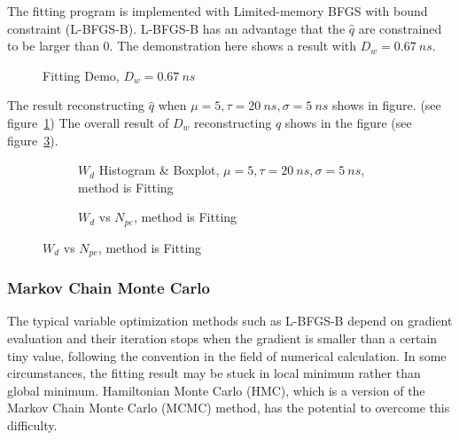 The fitting program is implemented with Limited-memory BFGS with bound constraint \cite{byrd_limited_1995} (L-BFGS-B). L-BFGS-B has an advantage that the $\hat{q}$ are constrained to be larger than 0. The demonstration here shows a result with $D_w = \SI{0.67}{ns}$.

\begin{figure}[H]
    \centering
    \scalebox{0.4}{}
    \caption{Fitting Demo, $D_w = \SI{0.67}{ns}$}
\end{figure}

The result reconstructing $\hat{q}$ when $\mu=5, \tau=\SI{20}{ns}, \sigma=\SI{5}{ns}$ shows in figure. (see figure~\ref{fig:fitting-hist}) The overall result of $D_w$ reconstructing $\hat{q}$ shows in the figure (see figure~\ref{fig:fitting-npe}). 

\begin{figure}[H]
\begin{minipage}[t]{.5\textwidth}
\begin{figure}[H]
    \centering
    \resizebox{\textwidth}{!}{}
    \caption{\label{fig:fitting-hist} $W_{d}$ Histogram \& Boxplot, $\mu=5, \tau=\SI{20}{ns}, \sigma=\SI{5}{ns}$, method is Fitting}
\end{figure}
\end{minipage}
\begin{minipage}[t]{.5\textwidth}
\begin{figure}[H]
    \centering
    \resizebox{\textwidth}{!}{}
    \caption{\label{fig:fitting-npe} $W_{d}$ vs $N_{pe}$, method is Fitting}
\end{figure}
\end{minipage}
\end{figure}

\subsubsection{Markov Chain Monte Carlo}

The typical variable optimization methods such as L-BFGS-B depend on gradient evaluation and their iteration stops when the gradient is smaller than a certain tiny value, following the convention in the field of numerical calculation. In some circumstances, the fitting result may be stuck in local minimum rather than global minimum. Hamiltonian Monte Carlo (HMC), which is a version of the Markov Chain Monte Carlo (MCMC) method, has the potential to overcome this difficulty. 

